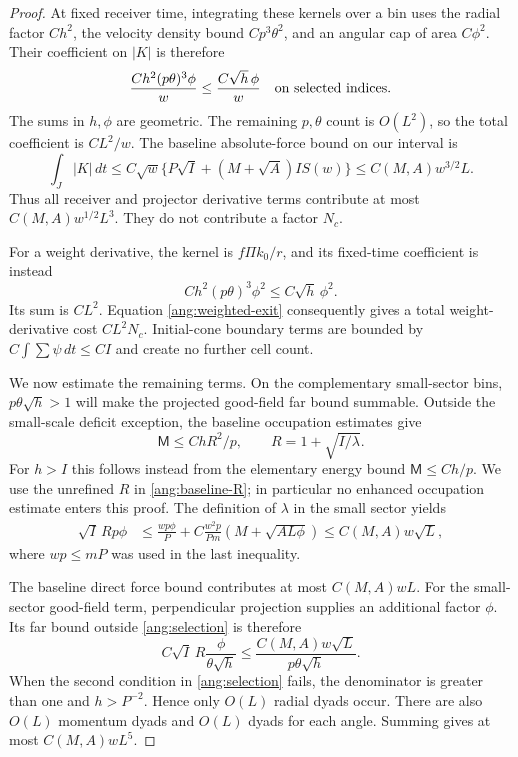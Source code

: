 \begin{proof}
At fixed receiver time, integrating these kernels over a bin uses
the radial factor $Ch^2$, the velocity density bound $Cp^3\theta^2$,
and an angular cap of area $C\phi^2$. Their coefficient on $|K|$ is
therefore
\begin{equation}\label{ang:receiver-coefficient}
 \frac{Ch^2(p\theta)^3\phi}{w}
 \le \frac{C\sqrt h\,\phi}{w}
 \quad\hbox{on selected indices}.
\end{equation}
The sums in $h,\phi$ are geometric. The remaining $p,\theta$ count
is $O(L^2)$, so the total coefficient is $CL^2/w$.
The baseline absolute-force bound on our interval is
\[
 \int_J|K|\,dt
 \le C\sqrt w\{P\sqrt I+(M+\sqrt A)IS(w)\}
 \le C(M,A)w^{3/2}L.
\]
Thus all receiver and projector derivative terms contribute at most
$C(M,A)w^{1/2}L^3$. They do not contribute a factor $N_c$.

For a weight derivative, the kernel is $f\Pi k_0/r$, and its fixed-time
coefficient is instead
\begin{equation}\label{ang:weight-coefficient}
 Ch^2(p\theta)^3\phi^2\le C\sqrt h\,\phi^2.
\end{equation}
Its sum is $CL^2$. Equation \eqref{ang:weighted-exit} consequently
gives a total weight-derivative cost $CL^2N_c$. Initial-cone boundary
terms are bounded by $C\int\sum\psi\,dt\le CI$ and create no further
cell count.

We now estimate the remaining terms. On the complementary small-sector
bins, $p\theta\sqrt h>1$ will make the projected good-field far bound
summable. Outside the small-scale deficit exception, the baseline
occupation estimates give
\begin{equation}\label{ang:baseline-R}
 \mathsf M\le ChR^2/p,
 \qquad R=1+\sqrt{I/\lambda}.
\end{equation}
For $h>I$ this follows instead from the elementary energy bound
$\mathsf M\le Ch/p$. We use the unrefined $R$ in
\eqref{ang:baseline-R}; in particular no enhanced occupation estimate
enters this proof. The definition of $\lambda$ in the small sector yields
\begin{align}
 \sqrt I\,Rp\phi
 &\le \frac{wp\phi}{P}
   +C\frac{w^2p}{Pm}\left(M+\sqrt{AL\phi}\right)
 \le C(M,A)w\sqrt L,                                      \label{ang:R-bound}
\end{align}
where $wp\le mP$ was used in the last inequality.

The baseline direct force bound contributes at most $C(M,A)wL$.
For the small-sector good-field term,
perpendicular projection supplies an additional factor $\phi$. Its far
bound outside \eqref{ang:selection} is therefore
\[
 C\sqrt I\,R\frac{\phi}{\theta\sqrt h}
 \le \frac{C(M,A)w\sqrt L}{p\theta\sqrt h}.
\]
When the second condition in \eqref{ang:selection} fails, the denominator
is greater than one and $h>P^{-2}$. Hence only $O(L)$ radial dyads occur.
There are also $O(L)$ momentum dyads and $O(L)$ dyads for each angle.
Summing gives at most $C(M,A)wL^5$.


\end{proof}
